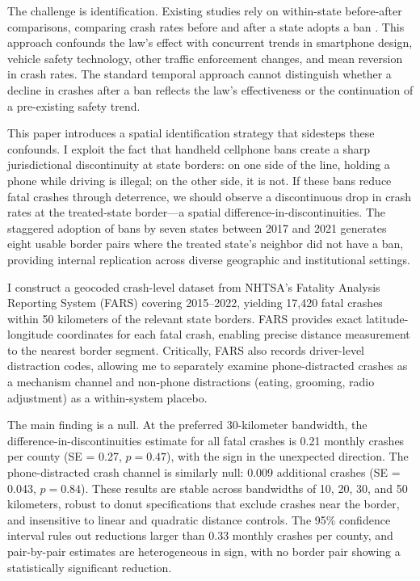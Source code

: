 \documentclass[12pt]{article}
\begin{document}
The challenge is identification. Existing studies rely on within-state before-after comparisons, comparing crash rates before and after a state adopts a ban \citep{Lim2017, Rocco2023}. This approach confounds the law's effect with concurrent trends in smartphone design, vehicle safety technology, other traffic enforcement changes, and mean reversion in crash rates. The standard temporal approach cannot distinguish whether a decline in crashes after a ban reflects the law's effectiveness or the continuation of a pre-existing safety trend.

This paper introduces a spatial identification strategy that sidesteps these confounds. I exploit the fact that handheld cellphone bans create a sharp jurisdictional discontinuity at state borders: on one side of the line, holding a phone while driving is illegal; on the other side, it is not. If these bans reduce fatal crashes through deterrence, we should observe a discontinuous drop in crash rates at the treated-state border---a spatial difference-in-discontinuities. The staggered adoption of bans by seven states between 2017 and 2021 generates eight usable border pairs where the treated state's neighbor did not have a ban, providing internal replication across diverse geographic and institutional settings.

I construct a geocoded crash-level dataset from NHTSA's Fatality Analysis Reporting System (FARS) covering 2015--2022, yielding 17,420 fatal crashes within 50 kilometers of the relevant state borders. FARS provides exact latitude-longitude coordinates for each fatal crash, enabling precise distance measurement to the nearest border segment. Critically, FARS also records driver-level distraction codes, allowing me to separately examine phone-distracted crashes as a mechanism channel and non-phone distractions (eating, grooming, radio adjustment) as a within-system placebo.

The main finding is a null. At the preferred 30-kilometer bandwidth, the difference-in-discontinuities estimate for all fatal crashes is 0.21 monthly crashes per county (SE = 0.27, $p = 0.47$), with the sign in the unexpected direction. The phone-distracted crash channel is similarly null: 0.009 additional crashes (SE = 0.043, $p = 0.84$). These results are stable across bandwidths of 10, 20, 30, and 50 kilometers, robust to donut specifications that exclude crashes near the border, and insensitive to linear and quadratic distance controls. The 95\% confidence interval rules out reductions larger than 0.33 monthly crashes per county, and pair-by-pair estimates are heterogeneous in sign, with no border pair showing a statistically significant reduction.
\end{document}
